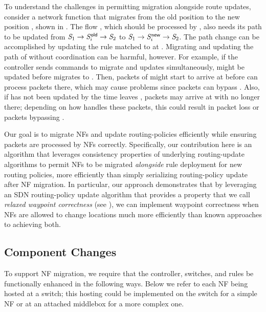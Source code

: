 To understand the challenges in permitting migration alongside route
updates, consider a network function \nfID{\nfIdx} that migrates from
the old position \oldSwitchID{\nfIdx} to the new position
\newSwitchID{\nfIdx}, shown in .  The flow \flowID{}, which should be processed
by \nfID{\nfIdx}, also needs its path to be updated from $\switchID{1}
\rightarrow \oldSwitchID{\nfIdx} \rightarrow \switchID{2}$ to
$\switchID{1} \rightarrow \newSwitchID{\nfIdx} \rightarrow
\switchID{2}$. The path change can be accomplished by updating the
rule matched to \flowID{} at . Migrating \nfID{\nfIdx} and
updating the path of \flowID{} without coordination can be harmful,
however. For example, if the controller sends commands to migrate
\nfID{\nfIdx} and updates  simultaneously, 
might be updated before \nfID{\nfIdx} migrates to
\newSwitchID{\nfIdx}. Then, packets of \flowID{} might start to arrive
at \newSwitchID{\nfIdx} before \nfID{\nfIdx} can process packets
there, which may cause problems since packets can bypass
\nfID{\nfIdx}. Also, if  has not been updated by the time
\nfID{\nfIdx} leaves \oldSwitchID{\nfIdx}, packets may arrive at
\oldSwitchID{\nfIdx} with \nfID{\nfIdx} no longer there; depending on
how \oldSwitchID{\nfIdx} handles these packets, this could result in
packet loss or packets bypassing \nfID{\nfIdx}.

Our goal is to migrate NFs and update routing-policies efficiently
while ensuring packets are processed by NFs correctly.  Specifically,
our contribution here is an algorithm that leverages consistency
properties of underlying routing-update algorithms to permit NFs to be
migrated \textit{alongside} rule deployment for new routing policies,
more efficiently than simply serializing routing-policy update after
NF migration.  In particular, our approach demonstrates that by
leveraging an SDN routing-policy update algorithm that provides a
property that we call \textit{relaxed waypoint correctness} (see
), we can implement waypoint
correctness when NFs are allowed to change locations much more
efficiently than known approaches to achieving both.

\subsection{Component Changes}
\label{sec:migration:components}

To support NF migration, we require that the controller, switches, and
rules be functionally enhanced in the following ways.  Below we refer
to each NF being hosted at a switch; this hosting could be implemented
on the switch for a simple NF or at an attached middlebox for a more
complex one.

